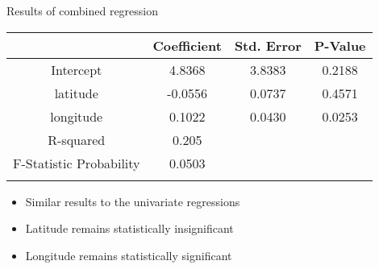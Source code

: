 \documentclass[10pt]{beamer}
\begin{document}
\begin{frame}{Results of combined regression}
  \centering
  \begin{tabular}{cccc}
      \hline
      {} &  Coefficient &  Std. Error &   P-Value \\
      \hline
      Intercept &     4.8368 &    3.8383 &  0.2188 \\
      latitude  &    -0.0556 &    0.0737 &  0.4571 \\
      longitude &     0.1022 &    0.0430 &  0.0253 \\
      \hline
      R-squared     &    0.205\\
      F-Statistic Probability &   0.0503\\
      \hline
      \vspace{1em}
      \end{tabular}
      
  \begin{itemize}
      \item Similar results to the univariate regressions 
      \item Latitude remains statistically insignificant
      \item Longitude remains statistically significant
  \end{itemize}
\end{frame}
\end{document}
